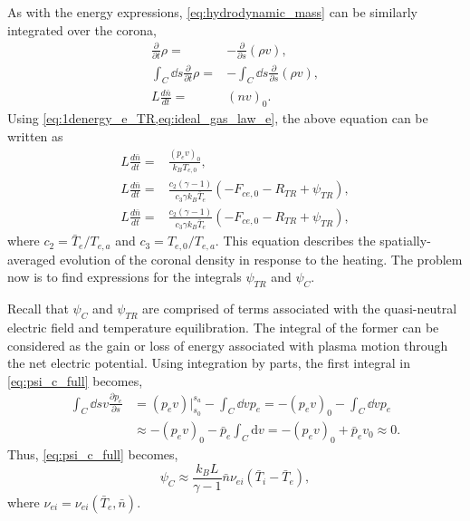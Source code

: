As with the energy expressions, \autoref{eq:hydrodynamic_mass} can be similarly integrated over the corona,
\begin{align}
    \frac{\partial}{\partial t}\rho =& -\frac{\partial}{\partial s}(\rho v), \nonumber \\
    \int_C\dd{s}\frac{\partial}{\partial t}\rho =& - \int_C\dd{s}\frac{\partial}{\partial s}(\rho v), \nonumber \\
    L\frac{d\bar{n}}{dt} =& (nv)_0. \nonumber
\end{align}
Using \autoref{eq:1denergy_e_TR,eq:ideal_gas_law_e}, the above equation can be written as
\begin{align}
    L\frac{d\bar{n}}{dt} =& \frac{(p_ev)_0}{k_BT_{e,0}}, \nonumber \\
    L\frac{d\bar{n}}{dt} =& \frac{c_2(\gamma - 1)}{c_3\gamma k_B\bar{T}_e}(-F_{ce,0} - R_{TR} + \psi_{TR}),\nonumber \\
    L\frac{d\bar{n}}{dt} =& \frac{c_2(\gamma - 1)}{c_3\gamma k_B\bar{T}_e}(-F_{ce,0} - R_{TR} + \psi_{TR}),\label{eq:0d_mass_sub}
\end{align}
where $c_2=\bar{T}_e/T_{e,a}$ and $c_3=T_{e,0}/T_{e,a}$. This equation describes the spatially-averaged evolution of the coronal density in response to the heating. The problem now is to find expressions for the integrals $\psi_{TR}$ and $\psi_C$.

Recall that $\psi_C$ and $\psi_{TR}$ are comprised of terms associated with the quasi-neutral electric field and temperature equilibration. The integral of the former can be considered as the gain or loss of energy associated with plasma motion through the net electric potential. Using integration by parts, the first integral in \autoref{eq:psi_c_full} becomes,
\begin{align}
    \int_C\dd{s}v\frac{\partial p_e}{\partial s} &= (p_ev)\Big|^{s_a}_{s_0} - \int_C\dd{v}p_e = -(p_ev)_0 - \int_C\dd{v} p_e\nonumber\\
    &\approx -(p_ev)_0 -\bar{p}_e\int_C\mathrm{d}v = -(p_ev)_0 + \bar{p}_ev_0 \approx 0.
\end{align}
Thus, \autoref{eq:psi_c_full} becomes,
\begin{equation}
    \psi_C\approx\frac{k_BL}{\gamma -1}\bar{n}\nu_{ei}(\bar{T}_i - \bar{T}_e),
    \label{eq:psi_C}
\end{equation}
where $\nu_{ei}=\nu_{ei}(\bar{T}_e,\bar{n})$.


